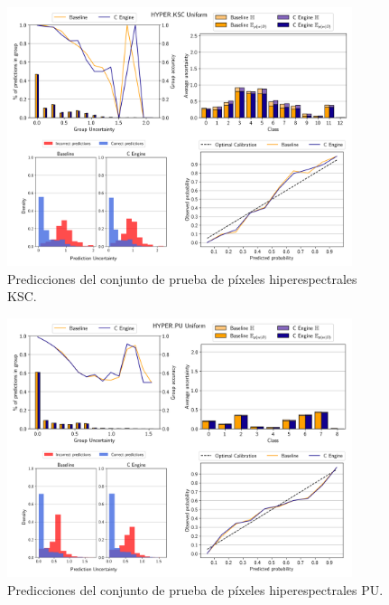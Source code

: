\begin{figure}[ht]
    \centering
    \includegraphics[width=0.9\textwidth]{root/Imagenes/anexo/Uniform-HYPER_KSC-mosaic.png}
    \caption{Predicciones del conjunto de prueba de píxeles hiperespectrales KSC.}
    \label{fig:anx-Uniform-HYPER_KSC}
\end{figure}


\begin{figure}[ht]
    \centering
    \includegraphics[width=0.9\textwidth]{root/Imagenes/anexo/Uniform-HYPER_PU-mosaic.png}
    \caption{Predicciones del conjunto de prueba de píxeles hiperespectrales PU.}
    \label{fig:anx-Uniform-HYPER_PU}
\end{figure}


